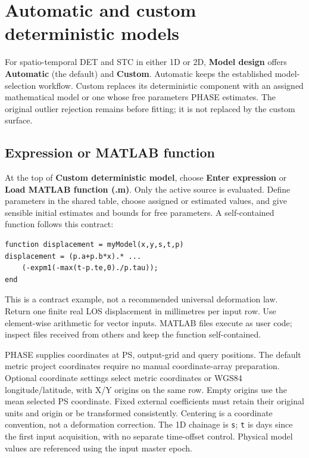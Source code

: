 \section{Automatic and custom deterministic models}\label{sec:custom-model}
For spatio-temporal DET and STC in either 1D or 2D, \textbf{Model design} offers \textbf{Automatic} (the default) and \textbf{Custom}. Automatic keeps the established model-selection workflow. Custom replaces its deterministic component with an assigned mathematical model or one whose free parameters PHASE estimates. The original outlier rejection remains before fitting; it is not replaced by the custom surface.

\subsection{Expression or MATLAB function}
At the top of \textbf{Custom deterministic model}, choose \textbf{Enter expression} or \textbf{Load MATLAB function (.m)}. Only the active source is evaluated. Define parameters in the shared table, choose assigned or estimated values, and give sensible initial estimates and bounds for free parameters. A self-contained function follows this contract:
\begin{lstlisting}[basicstyle=\ttfamily\small,breaklines=true,frame=single]
function displacement = myModel(x,y,s,t,p)
displacement = (p.a+p.b*x).* ...
    (-expm1(-max(t-p.te,0)./p.tau));
end
\end{lstlisting}
This is a contract example, not a recommended universal deformation law. Return one finite real LOS displacement in millimetres per input row. Use element-wise arithmetic for vector inputs. MATLAB files execute as user code; inspect files received from others and keep the function self-contained.

PHASE supplies coordinates at PS, output-grid and query positions. The default metric project coordinates require no manual coordinate-array preparation. Optional coordinate settings select metric coordinates or WGS84 longitude/latitude, with X/Y origins on the same row. Empty origins use the mean selected PS coordinate. Fixed external coefficients must retain their original units and origin or be transformed consistently. Centering is a coordinate convention, not a deformation correction. The 1D chainage is \texttt{s}; \texttt{t} is days since the first input acquisition, with no separate time-offset control. Physical model values are referenced using the input master epoch.

